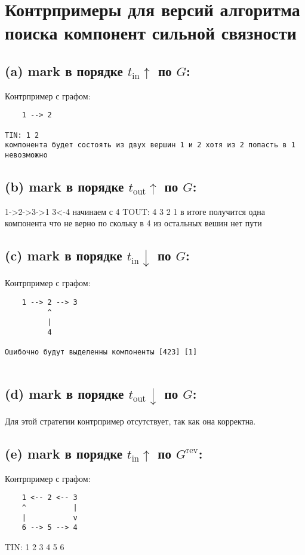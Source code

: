 \section*{Контрпримеры для версий алгоритма поиска компонент сильной связности}

\subsection*{(a) mark в порядке $t_{\text{in}} \uparrow$ по $G$:}
Контрпример с графом:
\begin{verbatim}
    1 --> 2

TIN: 1 2
компонента будет состоять из двух вершин 1 и 2 хотя из 2 попасть в 1 невозможно

\end{verbatim}

\subsection*{(b) mark в порядке $t_{\text{out}} \uparrow$ по $G$:}
1->2->3->1
3<-4
начинаем с 4
TOUT: 4 3 2 1
в итоге получится одна компонента  что не верно по скольку в 4 из остальных вешин нет пути


\subsection*{(c) mark в порядке $t_{\text{in}} \downarrow$ по $G$:}
Контрпример с графом:
\begin{verbatim}
    1 --> 2 --> 3
          ^
          |
          4

Ошибочно будут выделенны компоненты [423] [1] 
 
\end{verbatim}

\subsection*{(d) mark в порядке $t_{\text{out}} \downarrow$ по $G$:}
Для этой стратегии контрпример отсутствует, так как она корректна.

\subsection*{(e) mark в порядке $t_{\text{in}} \uparrow$ по $G^\text{rev}$:}
Контрпример с графом:
\begin{verbatim}
    1 <-- 2 <-- 3
    ^           |
    |           v
    6 --> 5 --> 4
\end{verbatim}
TIN: 1 2 3 4 5 6


